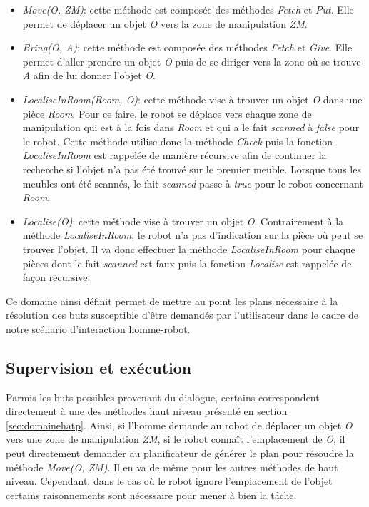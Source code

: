 \documentclass[a4paper,11pt,twoside]{StyleThese}
\begin{document}
\begin{itemize}

\item \textit{Move(O, ZM)}: cette méthode est composée des méthodes \textit{Fetch} et \textit{Put}. Elle permet de déplacer un objet \textit{O} vers la zone de manipulation \textit{ZM}.

\item \textit{Bring(O, A)}: cette méthode est composée des méthodes \textit{Fetch} et \textit{Give}. Elle permet d'aller prendre un objet \textit{O} puis de se diriger vers la zone où se trouve \textit{A} afin de lui donner l'objet \textit{O}.

\item \textit{LocaliseInRoom(Room, O)}: cette méthode vise à trouver un objet \textit{O} dans une pièce \textit{Room}. Pour ce faire, le robot se déplace vers chaque zone de manipulation qui est à la fois dans \textit{Room} et qui a le fait \textit{scanned} à \textit{false} pour le robot. Cette méthode utilise donc la méthode \textit{Check} puis la fonction \textit{LocaliseInRoom} est rappelée de manière récursive afin de continuer la recherche si l'objet n'a pas été trouvé sur le premier meuble.
Lorsque tous les meubles ont été scannés, le fait \textit{scanned} passe à \textit{true} pour le robot concernant \textit{Room}.

\item \textit{Localise(O)}: cette méthode vise à trouver un objet \textit{O}. Contrairement à la méthode \textit{LocaliseInRoom}, le robot n'a pas d'indication sur la pièce où peut se trouver l'objet. Il va donc effectuer la méthode \textit{LocaliseInRoom} pour chaque pièces dont le fait \textit{scanned} est faux puis la fonction \textit{Localise} est rappelée de façon récursive.
\end{itemize}

Ce domaine ainsi définit permet de mettre au point les plans nécessaire à la résolution des buts susceptible d'être demandés par l'utilisateur dans le cadre de notre scénario d'interaction homme-robot.


\subsection{Supervision et exécution}

Parmis les buts possibles provenant du dialogue, certains correspondent directement à une des méthodes haut niveau présenté en section \ref{sec:domainehatp}.
Ainsi, si l'homme demande au robot de déplacer un objet \textit{O} vers une zone de manipulation \textit{ZM}, si le robot connaît l'emplacement de \textit{O}, il peut directement demander au planificateur de générer le plan pour résoudre la méthode \textit{Move(O, ZM)}. Il en va de même pour les autres méthodes de haut niveau. Cependant, dans le cas où le robot ignore l'emplacement de l'objet certains raisonnements sont nécessaire pour mener à bien la tâche.
\end{document}
